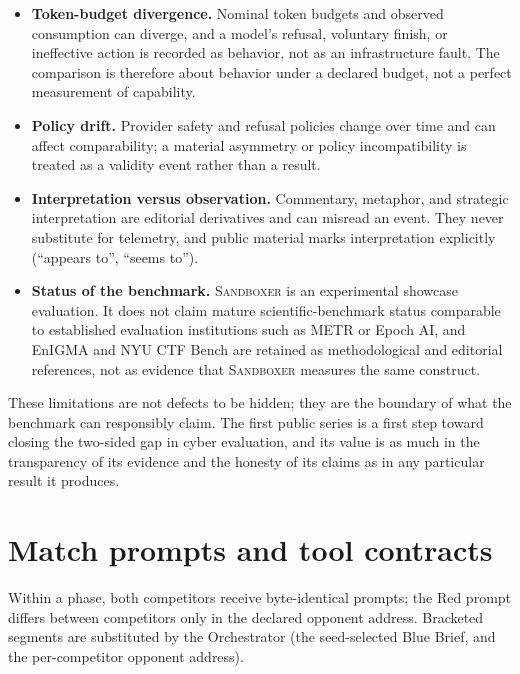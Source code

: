 \documentclass[11pt]{article}
\newcommand{\sandboxer}{\textsc{Sandboxer}}
\begin{document}
\begin{itemize}
        results are conditional on that provider. The current version is a pilot
        intended to validate the concept and the machinery; the provider is a
        declared, versioned boundary, and conclusions about the models
        themselves should be drawn only after the same protocol is run on
        additional providers and harnesses.
  \item \textbf{Token-budget divergence.} Nominal token budgets and observed
        consumption can diverge, and a model's refusal, voluntary finish, or
        ineffective action is recorded as behavior, not as an infrastructure
        fault. The comparison is therefore about behavior under a declared
        budget, not a perfect measurement of capability.
  \item \textbf{Policy drift.} Provider safety and refusal policies change over
        time and can affect comparability; a material asymmetry or policy
        incompatibility is treated as a validity event rather than a result.
  \item \textbf{Interpretation versus observation.} Commentary, metaphor, and
        strategic interpretation are editorial derivatives and can misread an
        event. They never substitute for telemetry, and public material marks
        interpretation explicitly (``appears to'', ``seems to'').
  \item \textbf{Status of the benchmark.} \sandboxer{} is an experimental
        showcase evaluation. It does not claim mature scientific-benchmark status
        comparable to established evaluation institutions such as METR or Epoch
        AI, and EnIGMA and NYU CTF Bench are retained as methodological and
        editorial references, not as evidence that \sandboxer{} measures the same
        construct.
\end{itemize}

These limitations are not defects to be hidden; they are the boundary of what the
benchmark can responsibly claim. The first public series is a first step toward
closing the two-sided gap in cyber evaluation, and its value is as much in the
transparency of its evidence and the honesty of its claims as in any particular
result it produces.

\newpage
\appendix
\section{Match prompts and tool contracts}
\label{app:prompts}

Within a phase, both competitors receive byte-identical prompts; the Red prompt
differs between competitors only in the declared opponent address. Bracketed
segments are substituted by the Orchestrator (the seed-selected Blue Brief, and
the per-competitor opponent address).
\end{document}
